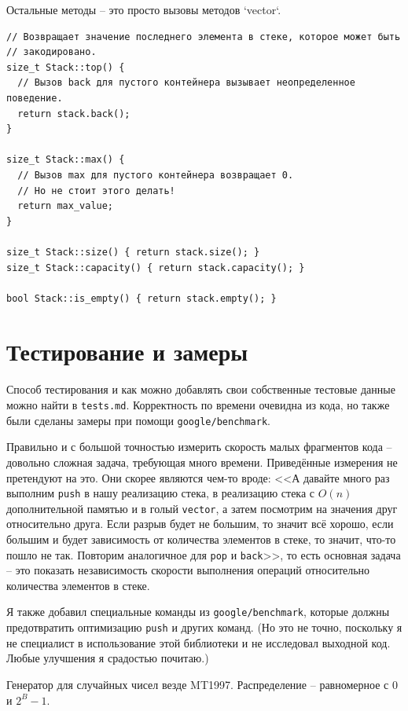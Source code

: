 Остальные методы -- это просто вызовы методов `vector`.
\begin{verbatim}
// Возвращает значение последнего элемента в стеке, которое может быть
// закодировано.
size_t Stack::top() {
  // Вызов back для пустого контейнера вызывает неопределенное поведение.
  return stack.back();
}

size_t Stack::max() {
  // Вызов max для пустого контейнера возвращает 0.
  // Но не стоит этого делать!
  return max_value;
}

size_t Stack::size() { return stack.size(); }
size_t Stack::capacity() { return stack.capacity(); }

bool Stack::is_empty() { return stack.empty(); }
\end{verbatim}

\section{Тестирование и замеры}

Способ тестирования и как можно добавлять свои собственные тестовые данные можно найти в \texttt{tests.md}. Корректность по времени очевидна из кода, но также были сделаны замеры при помощи \texttt{google/benchmark}. 

Правильно и с большой точностью измерить скорость малых фрагментов кода -- довольно сложная задача, требующая много времени. Приведённые измерения не претендуют на это. Они скорее являются чем-то вроде: <<А давайте много раз выполним \texttt{push} в нашу реализацию стека, в реализацию стека с \(O(n)\) дополнительной памятью и в голый \texttt{vector}, а затем посмотрим на значения друг относительно друга. Если разрыв будет не большим, то значит всё хорошо, если большим и будет зависимость от количества элементов в стеке, то значит, что-то пошло не так. Повторим аналогичное для \texttt{pop} и \texttt{back}>>, то есть основная задача -- это показать независимость скорости выполнения операций относительно количества элементов в стеке.

Я также добавил специальные команды из \texttt{google/benchmark}, которые должны предотвратить оптимизацию \texttt{push} и других команд. (Но это не точно, поскольку я не специалист в использование этой библиотеки и не исследовал выходной код. Любые улучшения я срадостью почитаю.) 

Генератор для случайных чисел везде MT1997. Распределение -- равномерное с \(0\) и \(2^B - 1\).

